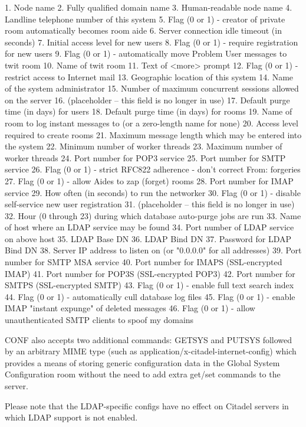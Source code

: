  1. Node name
 2. Fully qualified domain name
 3. Human-readable node name
 4. Landline telephone number of this system
 5. Flag (0 or 1) - creator of private room automatically becomes room aide
 6. Server connection idle timeout (in seconds)
 7. Initial access level for new users
 8. Flag (0 or 1) - require registration for new users
 9. Flag (0 or 1) - automatically move Problem User messages to twit room
 10. Name of twit room
 11. Text of <more> prompt
 12. Flag (0 or 1) - restrict access to Internet mail
 13. Geographic location of this system
 14. Name of the system administrator
 15. Number of maximum concurrent sessions allowed on the server
 16. (placeholder -- this field is no longer in use)
 17. Default purge time (in days) for users
 18. Default purge time (in days) for rooms
 19. Name of room to log instant messages to (or a zero-length name for none)
 20. Access level required to create rooms
 21. Maximum message length which may be entered into the system
 22. Minimum number of worker threads
 23. Maximum number of worker threads
 24. Port number for POP3 service
 25. Port number for SMTP service
 26. Flag (0 or 1) - strict RFC822 adherence - don't correct From: forgeries
 27. Flag (0 or 1) - allow Aides to zap (forget) rooms
 28. Port number for IMAP service
 29. How often (in seconds) to run the networker
 30. Flag (0 or 1) - disable self-service new user registration
 31. (placeholder -- this field is no longer in use)
 32. Hour (0 through 23) during which database auto-purge jobs are run
 33. Name of host where an LDAP service may be found
 34. Port number of LDAP service on above host
 35. LDAP Base DN
 36. LDAP Bind DN
 37. Password for LDAP Bind DN
 38. Server IP address to listen on (or "0.0.0.0" for all addresses)
 39. Port number for SMTP MSA service
 40. Port number for IMAPS (SSL-encrypted IMAP)
 41. Port number for POP3S (SSL-encrypted POP3)
 42. Port number for SMTPS (SSL-encrypted SMTP)
 43. Flag (0 or 1) - enable full text search index
 44. Flag (0 or 1) - automatically cull database log files
 45. Flag (0 or 1) - enable IMAP "instant expunge" of deleted messages
 46. Flag (0 or 1) - allow unauthenticated SMTP clients to spoof my domains

 CONF also accepts two additional commands: GETSYS and PUTSYS followed by an
arbitrary MIME type (such as application/x-citadel-internet-config) which
provides a means of storing generic configuration data in the Global System
Configuration room without the need to add extra get/set commands to the
server.

 Please note that the LDAP-specific configs have no effect on Citadel servers
in which LDAP support is not enabled.



